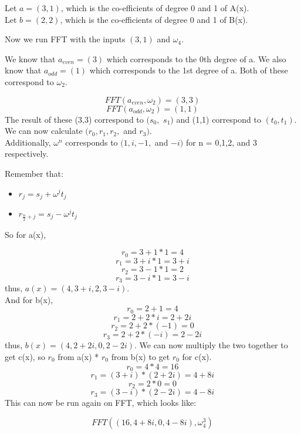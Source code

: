 \documentclass[11pt]{article}
\begin{document}
\noindent
Let \(a = (3,1)\), which is the co-efficients of degree 0 and 1 of A(x).\\
Let \(b = (2,2)\), which is the co-efficients of degree 0 and 1 of B(x).\\
\vspace{10pt}

\noindent
Now we run FFT with the inputs \((3,1)\) and \( \omega_4\).\\
\vspace{10pt}


We know that \(a_{even} = (3)\) which corresponds to the 0th degree of a. We also know that \(a_{odd} = (1)\) which corresponds to the 1st degree of a. Both of these correspond to \(\omega_2\).


\[FFT(a_{even}, \omega_{2}) = (3,3)\]
\[FFT(a_{odd}, \omega_{2}) = (1,1)\]
\noindent
The result of these (3,3) correspond to \((s_0,\)  \( s_1)\) and (1,1) correspond to \((t_0, t_1)\).\\
We can now calculate \((r_0, r_1, r_2,\) and \( r_3)\).\\
Additionally, \(\omega^{n}\) corresponds to \((1, i, -1,\) and \(-i)\) for n = 0,1,2, and 3 respectively.\\
\vspace{10pt}

\noindent
Remember that:
\begin{itemize}
        \item $r_j=s_j+\omega^jt_j$
        \item $r_{\frac{n}{2}+j}=s_j-\omega^jt_j$
    \end{itemize}
So for a(x),

\[r_0 = 3 + 1*1 = 4\]
\[r_1 = 3 + i*1 = 3 + i\]
\[r_2 = 3 - 1*1 = 2\]
\[r_3 = 3 - i*1 = 3-i\]
\noindent
thus, \(a(x) = (4, 3+i, 2, 3-i)\).\\
And for b(x),
\[r_0 = 2 + 1 = 4\]
\[r_1 = 2 + 2*i = 2 + 2i\]
\[r_2 = 2 + 2*(-1) = 0\]
\[r_3 = 2 + 2* (-i) = 2 - 2i\]
\noindent
thus,  \(b(x) = (4, 2+2i, 0, 2-2i)\).
We can now multiply the two together to get c(x), so \(r_0\) from a(x) * \(r_0\) from b(x) to get \(r_0\) for c(x).
\[r_0 = 4 * 4 = 16\]
\[r_1 = (3 + i)*(2+2i) = 4+8i\]
\[r_2 = 2 * 0 = 0\]
\[r_3 = (3 - i)*(2-2i) = 4-8i\]
This can now be run again on FFT, which looks like:

\[FFT((16,4+8i, 0, 4-8i), \omega_{4}^{3})\]











%
\end{document}
